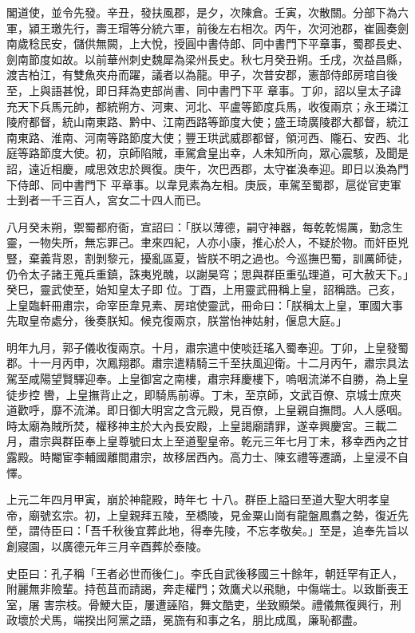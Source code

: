 \begin{pinyinscope}
 閣道使，並令先發。辛丑，發扶風郡，是夕，次陳倉。壬寅，次散關。分部下為六軍，潁王璬先行，壽王瑁等分統六軍，前後左右相次。丙午，次河池郡，崔圓奏劍南歲稔民安，儲供無闕，上大悅，授圓中書侍郎、同中書門下平章事，蜀郡長史、劍南節度如故。以前華州刺史魏犀為梁州長史。秋七月癸丑朔。壬戌，次益昌縣，渡吉柏江，有雙魚夾舟而躍，議者以為龍。甲子，次普安郡，憲部侍郎房琯自後至，上與語甚悅，即日拜為吏部尚書、同中書門下平
 章事。丁卯，詔以皇太子諱充天下兵馬元帥，都統朔方、河東、河北、平盧等節度兵馬，收復兩京；永王璘江陵府都督，統山南東路、黔中、江南西路等節度大使；盛王琦廣陵郡大都督，統江南東路、淮南、河南等路節度大使；豐王珙武威郡都督，領河西、隴石、安西、北庭等路節度大使。初，京師陷賊，車駕倉皇出幸，人未知所向，眾心震駭，及聞是詔，遠近相慶，咸思效忠於興復。庚午，次巴西郡，太守崔渙奉迎。即日以渙為門下侍郎、同中書門下
 平章事。以韋見素為左相。庚辰，車駕至蜀郡，扈從官吏軍士到者一千三百人，宮女二十四人而已。



 八月癸未朔，禦蜀都府衙，宣詔曰：「朕以薄德，嗣守神器，每乾乾惕厲，勤念生靈，一物失所，無忘罪己。聿來四紀，人亦小康，推心於人，不疑於物。而奸臣兇豎，棄義背恩，割剝黎元，擾亂區夏，皆朕不明之過也。今巡撫巴蜀，訓厲師徒，仍令太子諸王蒐兵重鎮，誅夷兇醜，以謝昊穹；思與群臣重弘理道，可大赦天下。」癸巳，靈武使至，始知皇太子即
 位。丁酉，上用靈武冊稱上皇，詔稱誥。己亥，上皇臨軒冊肅宗，命宰臣韋見素、房琯使靈武，冊命曰：「朕稱太上皇，軍國大事先取皇帝處分，後奏朕知。候克復兩京，朕當怡神姑射，偃息大庭。」



 明年九月，郭子儀收復兩京。十月，肅宗遣中使啖廷瑤入蜀奉迎。丁卯，上皇發蜀郡。十一月丙申，次鳳翔郡。肅宗遣精騎三千至扶風迎衛。十二月丙午，肅宗具法駕至咸陽望賢驛迎奉。上皇御宮之南樓，肅宗拜慶樓下，嗚咽流涕不自勝，為上皇徒步控
 轡，上皇撫背止之，即騎馬前導。丁未，至京師，文武百僚、京城士庶夾道歡呼，靡不流涕。即日御大明宮之含元殿，見百僚，上皇親自撫問。人人感咽。時太廟為賊所焚，權移神主於大內長安殿，上皇謁廟請罪，遂幸興慶宮。三載二月，肅宗與群臣奉上皇尊號曰太上至道聖皇帝。乾元三年七月丁未，移幸西內之甘露殿。時閹宦李輔國離間肅宗，故移居西內。高力士、陳玄禮等遷謫，上皇浸不自懌。



 上元二年四月甲寅，崩於神龍殿，時年七
 十八。群臣上謚曰至道大聖大明孝皇帝，廟號玄宗。初，上皇親拜五陵，至橋陵，見金粟山崗有龍盤鳳翥之勢，復近先塋，謂侍臣曰：「吾千秋後宜葬此地，得奉先陵，不忘孝敬矣。」至是，追奉先旨以創寢園，以廣德元年三月辛酉葬於泰陵。



 史臣曰：孔子稱「王者必世而後仁」。李氏自武後移國三十餘年，朝廷罕有正人，附麗無非險輩。持苞苴而請謁，奔走權門；效鷹犬以飛馳，中傷端士。以致斷喪王室，屠
 害宗枝。骨鯁大臣，屢遭誣陷，舞文酷吏，坐致顯榮。禮儀無復興行，刑政壞於犬馬，端揆出阿黨之語，冕旒有和事之名，朋比成風，廉恥都盡。




\end{pinyinscope}

